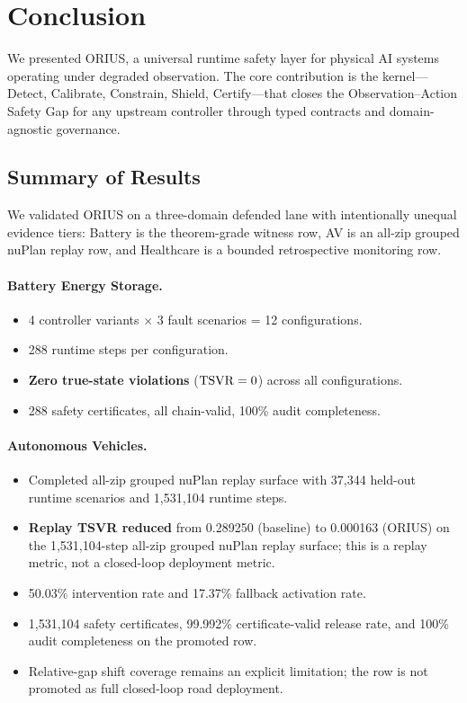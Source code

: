 \section{Conclusion}\label{sec:conclusion}

We presented ORIUS, a universal runtime safety layer for physical AI systems
operating under degraded observation.  The core contribution is the \dcs{}
kernel---Detect, Calibrate, Constrain, Shield, Certify---that closes the
Observation--Action Safety Gap for any upstream controller through typed
contracts and domain-agnostic governance.

\subsection{Summary of Results}

We validated ORIUS on a three-domain defended lane with intentionally unequal
evidence tiers: Battery is the theorem-grade witness row, AV is an all-zip grouped
nuPlan replay row, and Healthcare is a bounded retrospective monitoring row.

\paragraph{Battery Energy Storage.}
\begin{itemize}[nosep]
  \item 4 controller variants $\times$ 3 fault scenarios = 12 configurations.
  \item 288 runtime steps per configuration.
  \item \textbf{Zero true-state violations} ($\mathrm{TSVR} = 0$) across all configurations.
  \item 288 safety certificates, all chain-valid, 100\% audit completeness.
\end{itemize}

\paragraph{Autonomous Vehicles.}
\begin{itemize}[nosep]
  \item Completed all-zip grouped nuPlan replay surface with 37{,}344 held-out
        runtime scenarios and 1{,}531{,}104 runtime steps.
  \item \textbf{Replay TSVR reduced} from 0.289250 (baseline) to 0.000163
        (ORIUS) on the 1{,}531{,}104-step all-zip grouped nuPlan replay surface;
        this is a replay metric, not a closed-loop deployment metric.
  \item 50.03\% intervention rate and 17.37\% fallback activation rate.
  \item 1{,}531{,}104 safety certificates, 99.992\% certificate-valid release rate,
        and 100\% audit completeness on the promoted row.
  \item Relative-gap shift coverage remains an explicit limitation; the row is not
        promoted as full closed-loop road deployment.
\end{itemize}

